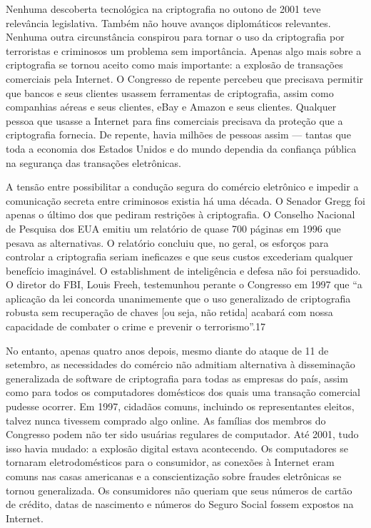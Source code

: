 \documentclass{book}
\begin{document}
Nenhuma descoberta tecnológica na criptografia no outono de 2001 teve relevância legislativa. Também não houve avanços diplomáticos relevantes. Nenhuma outra circunstância conspirou para tornar o uso da criptografia por terroristas e criminosos um problema sem importância. Apenas algo mais sobre a criptografia se tornou aceito como mais importante: a explosão de transações comerciais pela Internet. O Congresso de repente percebeu que precisava permitir que bancos e seus clientes usassem ferramentas de criptografia, assim como companhias aéreas e seus clientes, eBay e Amazon e seus clientes. Qualquer pessoa que usasse a Internet para fins comerciais precisava da proteção que a criptografia fornecia. De repente, havia milhões de pessoas assim --- tantas que toda a economia dos Estados Unidos e do mundo dependia da confiança pública na segurança das transações eletrônicas.

A tensão entre possibilitar a condução segura do comércio eletrônico e impedir a comunicação secreta entre criminosos existia há uma década. O Senador Gregg foi apenas o último dos que pediram restrições à criptografia. O Conselho Nacional de Pesquisa dos EUA emitiu um relatório de quase 700 páginas em 1996 que pesava as alternativas. O relatório concluiu que, no geral, os esforços para controlar a criptografia seriam ineficazes e que seus custos excederiam qualquer benefício imaginável. O establishment de inteligência e defesa não foi persuadido. O diretor do FBI, Louis Freeh, testemunhou perante o Congresso em 1997 que ``a aplicação da lei concorda unanimemente que o uso generalizado de criptografia robusta sem recuperação de chaves [ou seja, não retida] acabará com nossa capacidade de combater o crime e prevenir o terrorismo''.17

No entanto, apenas quatro anos depois, mesmo diante do ataque de 11 de setembro, as necessidades do comércio não admitiam alternativa à disseminação generalizada de software de criptografia para todas as empresas do país, assim como para todos os computadores domésticos dos quais uma transação comercial pudesse ocorrer. Em 1997, cidadãos comuns, incluindo os representantes eleitos, talvez nunca tivessem comprado algo online. As famílias dos membros do Congresso podem não ter sido usuárias regulares de computador. Até 2001, tudo isso havia mudado: a explosão digital estava acontecendo. Os computadores se tornaram eletrodomésticos para o consumidor, as conexões à Internet eram comuns nas casas americanas e a conscientização sobre fraudes eletrônicas se tornou generalizada. Os consumidores não queriam que seus números de cartão de crédito, datas de nascimento e números do Seguro Social fossem expostos na Internet.%
\end{document}
